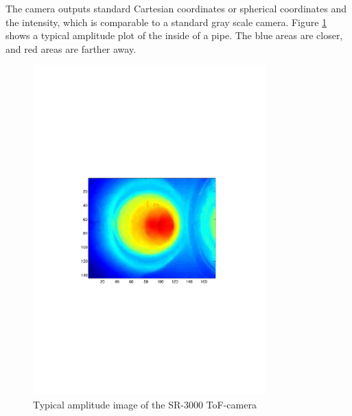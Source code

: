 The camera outputs standard Cartesian coordinates or spherical coordinates and the
intensity, which is comparable to a standard gray scale camera. Figure 
\ref{chap3:fig-tof-amppicture} shows a typical amplitude plot of the inside of a pipe. The
blue areas are closer, and red areas are farther away. 
\begin{figure}[htbp]
    \centering
    \includegraphics[width=0.8\textwidth]{pics/tof-amppicture}
    \caption{Typical amplitude image of the SR-3000 ToF-camera}
    \label{chap3:fig-tof-amppicture}
\end{figure}


